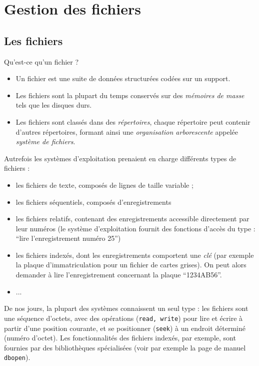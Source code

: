 \chapter{Gestion des fichiers}

\begin{multicols}{2}  

\section{Les fichiers}

Qu'est-ce qu'un fichier ?

\begin{itemize}
\item 
Un fichier est une suite de données structurées codées sur un support.
\item 
Les fichiers sont la plupart du temps conservés sur des \emph{mémoires de
masse} tels que les  disques durs. 
\item 
Les fichiers sont classés dans des  \emph{répertoires}, chaque
répertoire peut contenir d'autres répertoires, formant ainsi une
\emph{organisation arborescente} appelée \emph{système de fichiers}.
\end{itemize}



Autrefois les systèmes d'exploitation prenaient en charge différents
types de fichiers :
\begin{itemize}
\item les fichiers de texte, composés de lignes de taille variable ;
\item les fichiers séquentiels, composés d'enregistrements
\item les fichiers relatifs, contenant des enregistrements accessible directement par leur numéros (le système d'exploitation fournit des fonctions d'accès du type : ``lire l'enregistrement numéro 25'')
\item les fichiers indexés, dont les enregistrements comportent une
  \emph{clé} (par exemple la plaque d'immatriculation pour un fichier de cartes grises). On peut alors demander à lire l'enregistrement concernant la plaque
  ``1234AB56''.
\item ...
\end{itemize}

De nos jours, la plupart des systèmes connaissent un seul type : les
fichiers sont une séquence d'octets, avec des opérations
(\texttt{read, write}) pour lire et écrire à partir d'une position
courante, et se positionner (\texttt{seek}) à un endroit déterminé
(numéro d'octet).  Les fonctionnalités des fichiers indexés, par
exemple, sont fournies par des bibliothèques spécialisées (voir par exemple la page de manuel  \texttt{dbopen}).







\end{multicols}
